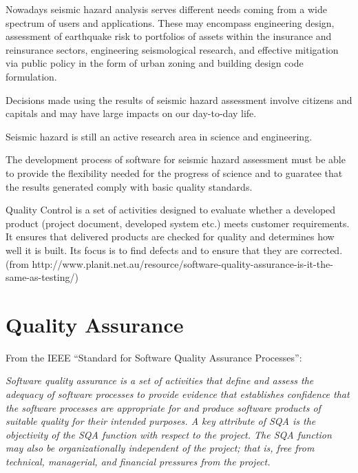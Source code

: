 Nowadays seismic hazard analysis serves different needs coming 
from a wide spectrum of users and applications. 
%
These may encompass engineering design, assessment of earthquake risk 
to portfolios of assets within the insurance and reinsurance sectors, 
engineering seismological research, and effective mitigation via public 
policy in the form of urban zoning and building design code formulation.

Decisions made using the results of seismic hazard assessment involve
citizens and capitals and may have large impacts on our day-to-day 
life. 

Seismic hazard is still an active research area in science and engineering.

The development process of software for seismic hazard assessment 
must be able to provide the flexibility needed for the progress of 
science and to guaratee that the results generated comply with basic
quality standards.

Quality Control is a set of activities designed to evaluate whether a 
developed product (project document, developed system etc.) meets 
customer requirements. It ensures that delivered products are checked 
for quality and determines how well it is built. 
Its focus is to find defects and to ensure that they are corrected.
(from
http://www.planit.net.au/resource/software-quality-assurance-is-it-the-same-as-testing/)

\section{Quality Assurance}


From the IEEE ``Standard for Software Quality Assurance Processes'':

\emph{Software quality assurance is a set of activities that define and 
assess the adequacy of software processes to provide evidence that establishes 
confidence that the software processes are appropriate for and produce 
software products of suitable quality for their intended purposes. 
A key attribute of SQA is the objectivity of the SQA function with 
respect to the project. The SQA function may also be organizationally 
independent of the project; that is, free from technical, managerial, 
and financial pressures from the project.}
